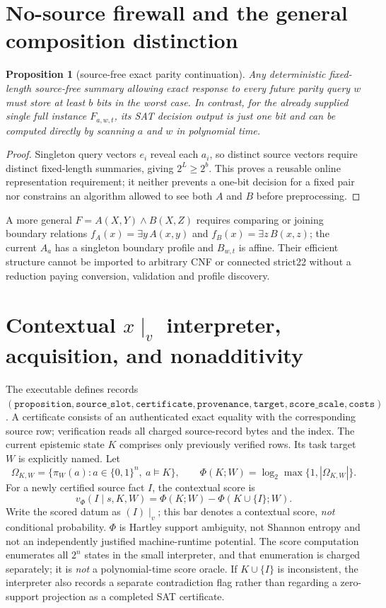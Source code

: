 \documentclass[10pt]{article}
\newtheorem{proposition}[theorem]{Proposition}
\begin{document}
\section{No-source firewall and the general composition distinction}
\begin{proposition}[source-free exact parity continuation]
Any deterministic fixed-length source-free summary allowing exact response to every future parity query $w$ must store at least $b$ bits in the worst case. In contrast, for the already supplied \emph{single} full instance $F_{a,w,t}$, its SAT decision output is just one bit and can be computed directly by scanning $a$ and $w$ in polynomial time.
\end{proposition}
\begin{proof}
Singleton query vectors $e_i$ reveal each $a_i$, so distinct source vectors require distinct fixed-length summaries, giving $2^L\ge2^b$. This proves a reusable online representation requirement; it neither prevents a one-bit decision for a fixed pair nor constrains an algorithm allowed to see both $A$ and $B$ before preprocessing.
\end{proof}
A more general $F=A(X,Y)\wedge B(X,Z)$ requires comparing or joining boundary relations $f_A(x)=\exists y\,A(x,y)$ and $f_B(x)=\exists z\,B(x,z)$; the current $A_a$ has a singleton boundary profile and $B_{w,t}$ is affine. Their efficient structure cannot be imported to arbitrary CNF or connected strict22 without a reduction paying conversion, validation and profile discovery.

\section{Contextual $x\mid_v$ interpreter, acquisition, and nonadditivity}
The executable defines records $(\texttt{proposition},\texttt{source\_slot},\texttt{certificate},\texttt{provenance},\texttt{target},\texttt{score\_scale},\texttt{costs})$. A certificate consists of an authenticated exact equality with the corresponding source row; verification reads all charged source-record bytes and the index. The current epistemic state $K$ comprises only previously verified rows. Its task target $W$ is explicitly named. Let
\[
 \Omega_{K,W}=\{\pi_W(a):a\in\{0,1\}^{n},\ a\models K\},
 \qquad \Phi(K;W)=\log_2\max\{1,|\Omega_{K,W}|\}.
\]
For a newly certified source fact $I$, the contextual score is
\[
 v_\Phi(I\mid s,K,W)=\Phi(K;W)-\Phi(K\cup\{I\};W).
\]
Write the scored datum as $(I)\mid_{v}$; this bar denotes a contextual score, \emph{not} conditional probability. $\Phi$ is Hartley support ambiguity, not Shannon entropy and not an independently justified machine-runtime potential. The score computation enumerates all $2^n$ states in the small interpreter, and that enumeration is charged separately; it is \emph{not} a polynomial-time score oracle. If $K\cup\{I\}$ is inconsistent, the interpreter also records a separate contradiction flag rather than regarding a zero-support projection as a completed SAT certificate.
\end{document}
